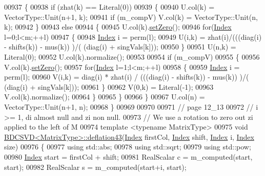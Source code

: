 \begin{DoxyCode}
00937   \{
00938     \textcolor{keywordflow}{if} (zhat(k) == Literal(0))
00939     \{
00940       U.col(k) = VectorType::Unit(n+1, k);
00941       \textcolor{keywordflow}{if} (m\_compV) V.col(k) = VectorType::Unit(n, k);
00942     \}
00943     \textcolor{keywordflow}{else}
00944     \{
00945       U.col(k).\hyperlink{class_eigen_1_1_plain_object_base_ac21ad5f989f320e46958b75ac8d9a1da}{setZero}();
00946       \textcolor{keywordflow}{for}(\hyperlink{namespace_eigen_a62e77e0933482dafde8fe197d9a2cfde}{Index} l=0;l<m;++l)
00947       \{
00948         \hyperlink{namespace_eigen_a62e77e0933482dafde8fe197d9a2cfde}{Index} i = perm(l);
00949         U(i,k) = zhat(i)/(((diag(i) - shifts(k)) - mus(k)) )/( (diag(i) + singVals[k]));
00950       \}
00951       U(n,k) = Literal(0);
00952       U.col(k).normalize();
00953     
00954       \textcolor{keywordflow}{if} (m\_compV)
00955       \{
00956         V.col(k).\hyperlink{class_eigen_1_1_plain_object_base_ac21ad5f989f320e46958b75ac8d9a1da}{setZero}();
00957         \textcolor{keywordflow}{for}(\hyperlink{namespace_eigen_a62e77e0933482dafde8fe197d9a2cfde}{Index} l=1;l<m;++l)
00958         \{
00959           \hyperlink{namespace_eigen_a62e77e0933482dafde8fe197d9a2cfde}{Index} i = perm(l);
00960           V(i,k) = diag(i) * zhat(i) / (((diag(i) - shifts(k)) - mus(k)) )/( (diag(i) + singVals[k]));
00961         \}
00962         V(0,k) = Literal(-1);
00963         V.col(k).normalize();
00964       \}
00965     \}
00966   \}
00967   U.col(n) = VectorType::Unit(n+1, n);
00968 \}
00969 
00970 
00971 \textcolor{comment}{// page 12\_13}
00972 \textcolor{comment}{// i >= 1, di almost null and zi non null.}
00973 \textcolor{comment}{// We use a rotation to zero out zi applied to the left of M}
00974 \textcolor{keyword}{template} <\textcolor{keyword}{typename} MatrixType>
00975 \textcolor{keywordtype}{void} \hyperlink{group___s_v_d___module_class_eigen_1_1_b_d_c_s_v_d}{BDCSVD<MatrixType>::deflation43}(\hyperlink{namespace_eigen_a62e77e0933482dafde8fe197d9a2cfde}{Index} firstCol, 
      \hyperlink{namespace_eigen_a62e77e0933482dafde8fe197d9a2cfde}{Index} shift, \hyperlink{namespace_eigen_a62e77e0933482dafde8fe197d9a2cfde}{Index} i, \hyperlink{namespace_eigen_a62e77e0933482dafde8fe197d9a2cfde}{Index} size)
00976 \{
00977   \textcolor{keyword}{using} std::abs;
00978   \textcolor{keyword}{using} std::sqrt;
00979   \textcolor{keyword}{using} std::pow;
00980   \hyperlink{namespace_eigen_a62e77e0933482dafde8fe197d9a2cfde}{Index} start = firstCol + shift;
00981   RealScalar c = m\_computed(start, start);
00982   RealScalar s = m\_computed(start+i, start);

\end{DoxyCode}
